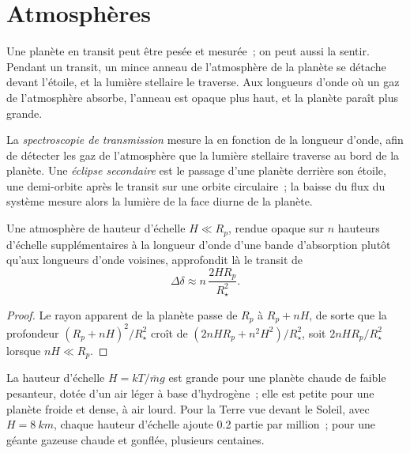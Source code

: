 \section{Atmosphères}\label{sec:b3:exoplanets:atmospheres}

Une planète en transit peut être pesée et mesurée~; on peut aussi la sentir.
Pendant un transit, un mince anneau de l'atmosphère de la planète se détache
devant l'étoile, et la lumière stellaire le traverse. Aux longueurs
d'onde où un gaz de l'atmosphère absorbe, l'anneau est opaque plus haut, et
la planète paraît plus grande.

\begin{definition}\label{def:b3:exoplanets:transmission}
La \emph{spectroscopie de transmission} mesure
la  en fonction de la longueur d'onde, afin de détecter les
gaz de l'atmosphère que la lumière stellaire traverse au bord de la planète. Une
\emph{éclipse secondaire} est le passage d'une
planète derrière son étoile, une demi-orbite après le transit sur une orbite
circulaire~; la baisse du flux du système mesure alors la lumière de la
face diurne de la planète.
\end{definition}

\begin{proposition}\label{prop:b3:exoplanets:transmission}
Une atmosphère de hauteur d'échelle $H \ll R_p$, rendue opaque sur $n$ hauteurs
d'échelle supplémentaires à la longueur d'onde d'une bande d'absorption plutôt
qu'aux longueurs d'onde voisines, approfondit là le transit de
\[
\Delta\delta \approx n\,\frac{2HR_p}{R_\star^2} .
\]
\end{proposition}

\begin{proof}
Le rayon apparent de la planète passe de $R_p$ à $R_p + nH$, de sorte que la
profondeur $(R_p + nH)^2/R_\star^2$ croît de $(2nHR_p + n^2H^2)/R_\star^2$,
soit $2nHR_p/R_\star^2$ lorsque $nH \ll R_p$.
\end{proof}

La hauteur d'échelle $H = kT/\bar m g$ est grande pour une planète chaude de
faible pesanteur, dotée d'un air léger à base d'hydrogène~; elle est petite pour
une planète froide et dense, à air lourd. Pour la Terre vue devant le Soleil, avec
$H = \qty{8}{km}$, chaque hauteur d'échelle ajoute 0.2 partie par million~; pour une
géante gazeuse chaude et gonflée, plusieurs centaines.

